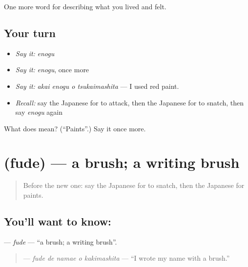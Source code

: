 \begin{grammarlens}[title={What you've built}]
One more word for describing what you lived and felt.
\end{grammarlens}

\subsection*{Your turn}
\begin{itemize}
\raggedright
  \item \emph{Say it:} \emph{enogu}
  \item \emph{Say it:} \emph{enogu}, once more
  \item \emph{Say it:} \emph{akai enogu o tsukaimashita} — I used red paint.
  \item \emph{Recall:} say the Japanese for to attack, then the Japanese for to snatch, then say \emph{enogu} again
\end{itemize}

\begin{tcolorbox}[breakable,colback=teal!4,colframe=teal!35!black,title={Before you move on}]
What does  mean? (\textquotedblleft{}Paints\textquotedblright{}.) Say it once more.
\end{tcolorbox}
\section[\texorpdfstring{\ja{ふで} (fude)}{ふで (fude)}]{ (fude) — a brush; a writing brush}

\label{lesson:JA-C465-fude}



\begin{quote}
Before the new one: say the Japanese for to snatch, then the Japanese for paints.
\end{quote}

\subsection*{You'll want to know: }
\textbf{} — \emph{fude} — \textquotedblleft{}a brush; a writing brush\textquotedblright{}.

\begin{quote}
\textbf{  } — \emph{fude de namae o kakimashita} — \textquotedblleft{}I wrote my name with a brush.\textquotedblright{}
\end{quote}

